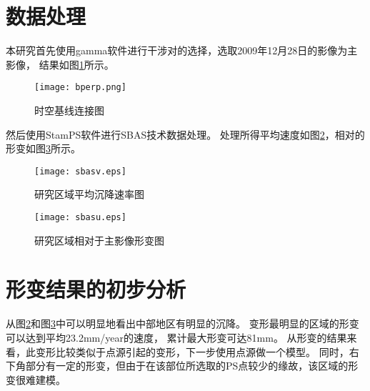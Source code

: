 \section{数据处理}

本研究首先使用gamma软件进行干涉对的选择，选取2009年12月28日的影像为主影像，
结果如图\ref{fig:bprep}所示。
\begin{figure}[htb]
    \centering
    \texttt{[image: bperp.png]}
    \caption{时空基线连接图}
    \label{fig:bprep}
\end{figure}
然后使用StamPS软件进行SBAS技术数据处理。
处理所得平均速度如图\ref{fig:sbasv}，相对的形变如图\ref{fig:sbasu}所示。
\begin{figure}[htb]
    \centering
    \texttt{[image: sbasv.eps]}
    \caption{研究区域平均沉降速率图}
    \label{fig:sbasv}
\end{figure}
\begin{figure}[htb]
    \centering
    \texttt{[image: sbasu.eps]}
    \caption{研究区域相对于主影像形变图}
    \label{fig:sbasu}
\end{figure}

\section{形变结果的初步分析}
从图\ref{fig:sbasv}和图\ref{fig:sbasu}中可以明显地看出中部地区有明显的沉降。
变形最明显的区域的形变可以达到平均23.2mm/year的速度，
累计最大形变可达81mm。
从形变的结果来看，此变形比较类似于点源引起的变形，下一步使用点源做一个模型。
同时，右下角部分有一定的形变，但由于在该部位所选取的PS点较少的缘故，该区域的形变很难建模。
